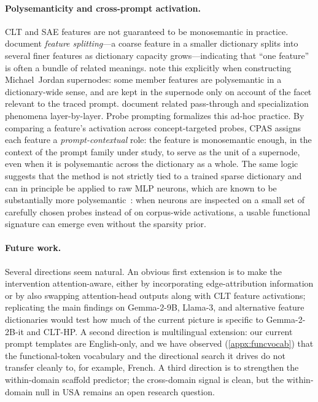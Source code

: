 \paragraph{Polysemanticity and cross-prompt activation.}
CLT and SAE features are not guaranteed to be monosemantic in practice. \citet{templeton2024scaling} document \emph{feature splitting}---a coarse feature in a smaller dictionary splits into several finer features as dictionary capacity grows---indicating that ``one feature'' is often a bundle of related meanings. \citet{lindsey2025biology} note this explicitly when constructing Michael~Jordan supernodes: some member features are polysemantic in a dictionary-wide sense, and are kept in the supernode only on account of the facet relevant to the traced prompt. \citet{balcells2024evolution} document related pass-through and specialization phenomena layer-by-layer. Probe prompting formalizes this ad-hoc practice. By comparing a feature's activation across concept-targeted probes, CPAS assigns each feature a \emph{prompt-contextual} role: the feature is monosemantic enough, in the context of the prompt family under study, to serve as the unit of a supernode, even when it is polysemantic across the dictionary as a whole. The same logic suggests that the method is not strictly tied to a trained sparse dictionary and can in principle be applied to raw MLP neurons, which are known to be substantially more polysemantic~\cite{anon2026sparsity}: when neurons are inspected on a small set of carefully chosen probes instead of on corpus-wide activations, a usable functional signature can emerge even without the sparsity prior.

\paragraph{Future work.}
Several directions seem natural. An obvious first extension is to make the intervention attention-aware, either by incorporating edge-attribution information or by also swapping attention-head outputs along with CLT feature activations; replicating the main findings on Gemma-2-9B, Llama-3, and alternative feature dictionaries would test how much of the current picture is specific to Gemma-2-2B-it and CLT-HP. A second direction is multilingual extension: our current prompt templates are English-only, and we have observed (\cref{appx:funcvocab}) that the functional-token vocabulary and the directional search it drives do not transfer cleanly to, for example, French. A third direction is to strengthen the within-domain scaffold predictor; the cross-domain signal is clean, but the within-domain null in USA remains an open research question.

